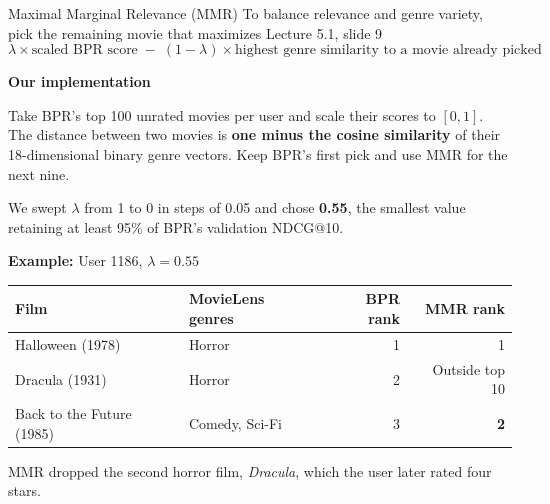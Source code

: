 \documentclass[aspectratio=169,9pt,t]{beamer}
\begin{document}
\begin{frame}{Maximal Marginal Relevance (MMR)}
  \setlength{\belowdisplayskip}{3pt}
  \setlength{\belowdisplayshortskip}{3pt}
  To balance relevance and genre variety, pick the remaining movie that maximizes
  \hfill{\small\color{Muted}Lecture 5.1, slide 9}
  \[
    \lambda \times \text{scaled BPR score}
    \;-\; (1-\lambda) \times \text{highest genre similarity to a movie already picked}
  \]

  \textbf{Our implementation}\par\smallskip
  Take BPR's top 100 unrated movies per user and scale their scores to $[0,1]$.
  The distance between two movies is \alert{\textbf{one minus the cosine similarity}}
  of their 18-dimensional binary genre vectors.
  Keep BPR's first pick and use MMR for the next nine.
  \par\smallskip
  We swept $\lambda$ from 1 to 0 in steps of 0.05 and chose \alert{\textbf{0.55}},
  the smallest value retaining at least 95\% of BPR's validation NDCG@10.

  \bigskip
  \textbf{Example:} User 1186, $\lambda=0.55$ \par\smallskip
  \renewcommand{\arraystretch}{1.12}
  \begin{tabularx}{\linewidth}{@{}Xlrr@{}}
    \toprule
    \textbf{Film} & \textbf{MovieLens genres} & \textbf{BPR rank} & \textbf{MMR rank} \\
    \midrule
    Halloween (1978)          & Horror         & 1 & 1 \\
    Dracula (1931)            & Horror         & 2 & Outside top 10 \\
    Back to the Future (1985) & Comedy, Sci-Fi & 3 & \alert{\textbf{2}} \\
    \bottomrule
  \end{tabularx}

  \smallskip
  MMR dropped the second horror film, \textit{Dracula}, which the user later rated four stars.
\end{frame}
\end{document}
